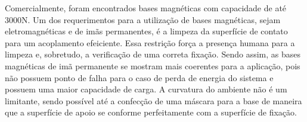 Comercialmente, foram encontrados bases magnéticas com capacidade de até 3000N.
Um dos requerimentos para a utilização de bases magnéticas, sejam
eletromagnéticas e de imãs permanentes, é a limpeza da superfície de contato
para um acoplamento efeiciente. Essa restrição força a presença humana para a
limpeza e, sobretudo, a verificação de uma correta fixação. Sendo assim, as
bases magnéticas de imã permanente se mostram mais coerentes para a aplicação,
pois não possuem ponto de falha para o caso de perda de energia do sistema e
possuem uma maior capacidade de carga. A curvatura do ambiente não é um
limitante, sendo possível até a confecção de uma máscara para a base de maneira
que a superfície de apoio se conforme perfeitamente com a superfície de fixação.
